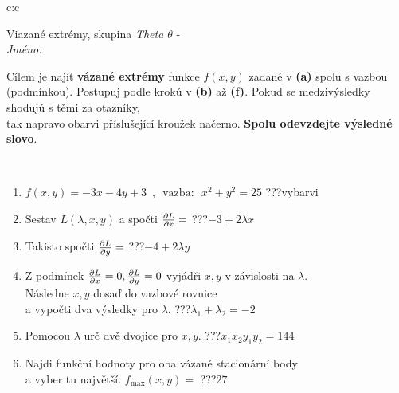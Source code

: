 \documentclass[10pt]{report}
\begin{document}
\begin{tabular}{c:c}
\begin{minipage}[c][104.5mm][t]{0.5\linewidth}
\begin{center}
\vspace{7mm}
{\huge Viazané extrémy, skupina \textit{Theta $\theta$} -}\\[5mm]
\textit{Jméno:}\phantom{xxxxxxxxxxxxxxxxxxxxxxxxxxxxxxxxxxxxxxxxxxxxxxxxxxxxxxxxxxxxxxxxx}\\[5mm]
\begin{minipage}{0.95\linewidth}
\begin{center}
Cílem je najít \textbf{vázané extrémy} funkce $f(x,y)$ zadané v \textbf{(a)} spolu s vazbou (podmínkou). Postupuj podle krokú v \textbf{(b)} až \textbf{(f)}. Pokud se medzivýsledky shodujú s těmi za otazníky,\\tak napravo obarvi příslušející kroužek načerno. \textbf{Spolu odevzdejte výsledné slovo}.
\end{center}
\end{minipage}
\\[1mm]
\begin{minipage}{0.79\linewidth}
\begin{center}
\begin{varwidth}{\linewidth}
\begin{enumerate}
\normalsize
\item $f(x,y)=-3x-4y+3 \enspace , \enspace \mathrm{vazba:} \enspace x^2+y^2=25$\quad \dotfill\; ???\;\dotfill \quad vybarvi
\item Sestav $L(\lambda,x,y)$ a spočti $\pdv{L}{x}=$\quad \dotfill\; ???\;\dotfill \quad $-3+2\lambda x$
\item Takisto spočti $\pdv{L}{y}=$\quad \dotfill\; ???\;\dotfill \quad $-4+2\lambda y$
\item Z podmínek $\pdv{L}{x}=0 , \pdv{L}{y}=0$ vyjádři $x,y$ v závislosti na $\lambda$.\\ \phantom{xxxxxx}Následne $x,y$ dosaď do vazbové rovnice\\ \phantom{xxxxxx}a vypočti dva výsledky pro $\lambda$.\quad \dotfill\; ???\;\dotfill \quad $\lambda_1+\lambda_2=-2$
\item Pomocou $\lambda$ urč dvě dvojice pro $x,y$.\quad \dotfill\; ???\;\dotfill \quad $x_1 x_2 y_1 y_2=144$
\item Najdi funkční hodnoty pro oba vázané stacionární body\\ \phantom{xxxxxx}a vyber tu najvětší. $f_{\text{max}}(x,y)=$\quad \dotfill\; ???\;\dotfill \quad $27$

\end{enumerate}
\end{varwidth}
\end{center}
\end{minipage}
\end{center}
\end{minipage}
\end{tabular}
\end{document}
